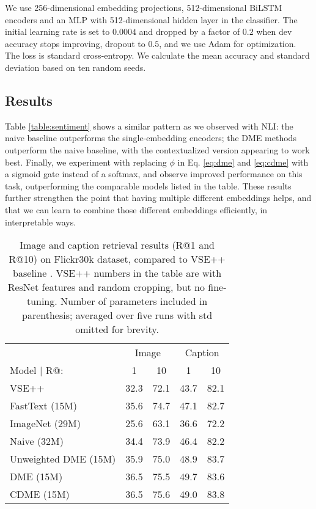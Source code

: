 \documentclass[11pt,a4paper]{article}
\begin{document}
We use 256-dimensional embedding projections, 512-dimensional BiLSTM encoders and an MLP with 512-dimensional hidden layer in the classifier. The initial learning rate is set to $0.0004$ and dropped by a factor of $0.2$ when dev accuracy stops improving, dropout to $0.5$, and we use Adam for optimization. The loss is standard cross-entropy. We calculate the mean accuracy and standard deviation based on ten random seeds.

\subsection{Results}
Table \ref{table:sentiment} shows a similar pattern as we observed with NLI: the naive baseline outperforms the single-embedding encoders; the DME methods outperform the naive baseline, with the contextualized version appearing to work best. Finally, we experiment with replacing $\phi$ in Eq. \ref{eq:dme} and \ref{eq:cdme} with a sigmoid gate instead of a softmax, and observe improved performance on this task, outperforming the comparable models listed in the table. These results further strengthen the point that having multiple different embeddings helps, and that we can learn to combine those different embeddings efficiently, in interpretable ways.

\begin{table}[t]
  \centering
  \small
  \begin{tabular}{lcccc}
    \toprule
    & \multicolumn{2}{c}{Image} & \multicolumn{2}{c}{Caption}\\
    Model $|  $ R@: & 1 & 10 & 1 & 10\\
    \midrule
    VSE++ & 32.3 & 72.1 & 43.7 & 82.1\\\midrule
	FastText (15M) & 35.6 & 74.7 & 47.1 & 82.7 \\
	ImageNet (29M) & 25.6 & 63.1 & 36.6  & 72.2 \\
	Naive (32M) & 34.4 & 73.9 & 46.4 & 82.2\\\midrule
	Unweighted DME (15M) & 35.9 & 75.0 & 48.9 & 83.7\\
    DME (15M) & 36.5 & 75.5 & 49.7 & 83.6\\
CDME (15M) & 36.5 & 75.6 & 49.0 & 83.8\\
\bottomrule
  \end{tabular}
  \caption{\label{table:imgcap}Image and caption retrieval results (R@1 and R@10) on Flickr30k dataset, compared to VSE++ baseline \cite{Faghri:2017arxiv}. VSE++ numbers in the table are with ResNet features and random cropping, but no fine-tuning. Number of parameters included in parenthesis; averaged over five runs with std omitted for brevity.}
\end{table}
\end{document}

